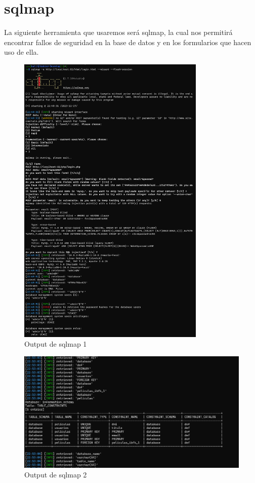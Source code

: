\documentclass{report}
\begin{document}
        \section{sqlmap}
            La siguiente herramienta que usaremos será sqlmap, la cual nos permitirá encontrar fallos de seguridad en la base de datos y en los formularios que hacen uso de ella.
            \begin{figure}[H]
                \centering
                \includegraphics[width=0.80\textwidth]{./img/audit1/sqlmap1.png}
                \caption{Output de sqlmap 1}
            \end{figure}
            \begin{figure}[H]
                \centering
                \includegraphics[width=\textwidth]{./img/audit1/sqlmap2.png}
                \caption{Output de sqlmap 2}
            \end{figure}
\end{document}
